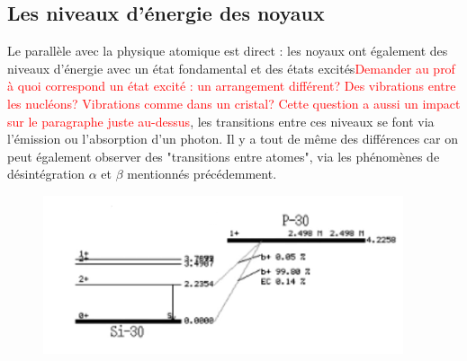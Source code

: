 \subsection{Les niveaux d'énergie des noyaux}
Le parallèle avec la physique atomique est direct : les noyaux ont également des niveaux d'énergie avec un état fondamental et des états excités\textcolor{red}{Demander au prof à quoi correspond un état excité : un arrangement différent? Des vibrations entre les nucléons? Vibrations comme dans un cristal? Cette question a aussi un impact sur le paragraphe juste au-dessus}, les transitions entre ces niveaux se font via l'émission ou l'absorption d'un photon. Il y a tout de même des différences car on peut également observer des "transitions entre atomes", via les phénomènes de désintégration $\alpha$ et $\beta$ mentionnés précédemment.

\begin{figure}[H]
    \centering
    \includegraphics[scale=1.3]{Images4/NiveauxAtomes.PNG}
\end{figure}


